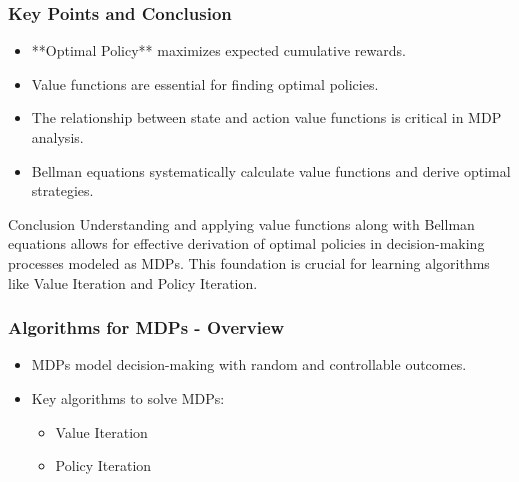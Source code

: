 \documentclass[aspectratio=169]{beamer}
\begin{document}
\begin{frame}[fragile]
    \frametitle{Key Points and Conclusion}
    \begin{itemize}
        \item **Optimal Policy** maximizes expected cumulative rewards.
        \item Value functions are essential for finding optimal policies.
        \item The relationship between state and action value functions is critical in MDP analysis.
        \item Bellman equations systematically calculate value functions and derive optimal strategies.
    \end{itemize}

    \begin{block}{Conclusion}
        Understanding and applying value functions along with Bellman equations allows for effective derivation of optimal policies in decision-making processes modeled as MDPs. This foundation is crucial for learning algorithms like Value Iteration and Policy Iteration.
    \end{block}
\end{frame}

\begin{frame}[fragile]
    \frametitle{Algorithms for MDPs - Overview}
    \begin{itemize}
        \item MDPs model decision-making with random and controllable outcomes.
        \item Key algorithms to solve MDPs:
        \begin{itemize}
            \item Value Iteration
            \item Policy Iteration
        \end{itemize}
    \end{itemize}
\end{frame}
\end{document}
